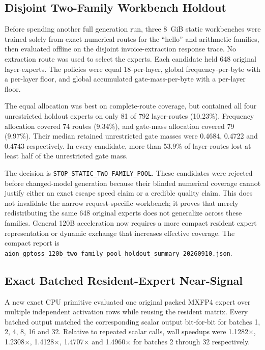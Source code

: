 \subsection{Disjoint Two-Family Workbench Holdout}

Before spending another full generation run, three 8~GiB static workbenches
were trained solely from exact numerical routes for the ``hello'' and arithmetic
families, then evaluated offline on the disjoint invoice-extraction response
trace.  No extraction route was used to select the experts.  Each candidate
held 648 original layer-experts.  The policies were equal 18-per-layer,
global frequency-per-byte with a per-layer floor, and global accumulated
gate-mass-per-byte with a per-layer floor.

The equal allocation was best on complete-route coverage, but contained all
four unrestricted holdout experts on only 81 of 792 layer-routes (10.23\%).
Frequency allocation covered 74 routes (9.34\%), and gate-mass allocation
covered 79 (9.97\%).  Their median retained unrestricted gate masses were
0.4684, 0.4722 and 0.4743 respectively.  In every candidate, more than 53.9\%
of layer-routes lost at least half of the unrestricted gate mass.

The decision is \texttt{STOP\_STATIC\_TWO\_FAMILY\_POOL}.  These candidates
were rejected before changed-model generation because their blinded numerical
coverage cannot justify either an exact escape speed claim or a credible
quality claim.  This does not invalidate the narrow request-specific workbench;
it proves that merely redistributing the same 648 original experts does not
generalize across these families.  General 120B acceleration now requires a
more compact resident expert representation or dynamic exchange that increases
effective coverage.  The compact report is
\texttt{aion\_gptoss\_120b\_two\_family\_pool\_holdout\_summary\_20260910.json}.

\subsection{Exact Batched Resident-Expert Near-Signal}

A new exact CPU primitive evaluated one original packed MXFP4 expert over
multiple independent activation rows while reusing the resident matrix.  Every
batched output matched the corresponding scalar output bit-for-bit for batches
1, 2, 4, 8, 16 and 32.  Relative to repeated scalar calls, wall speedups were
1.1282$\times$, 1.2308$\times$, 1.4128$\times$, 1.4707$\times$ and
1.4960$\times$ for batches 2 through 32 respectively.

